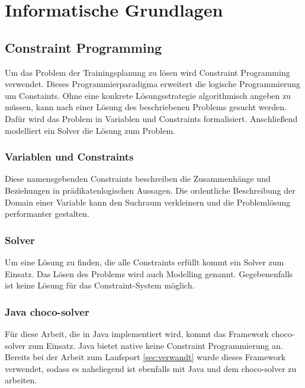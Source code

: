 \chapter{Informatische Grundlagen}
\label{sec:grundlagen:info}
\section{Constraint Programming}
Um das Problem der Trainingsplanung zu lösen wird Constraint Programming verwendet.\cite{ConstraintProgrammierung} Dieses Programmierparadigma erweitert die logische Programmierung um Constaints. Ohne eine konkrete Lösungsstrategie algorithmisch angeben zu müssen, kann nach einer Lösung des beschriebenen Problems gesucht werden. Dafür wird das Problem in Variablen und Constraints formalisiert. Anschließend modelliert ein Solver die Lösung zum Problem.
\subsection{Variablen und Constraints}
Diese namensgebenden Constraints beschreiben die Zusammenhänge und Beziehungen in prädikatenlogischen Aussagen. Die ordentliche Beschreibung der Domain einer Variable kann den Suchraum verkleinern und die Problemlösung performanter gestalten.
\subsection{Solver}
Um eine Lösung zu finden, die alle Constraints erfüllt kommt ein Solver zum Einsatz. Das Lösen des Problems wird auch Modelling genannt. Gegebenenfalls ist keine Lösung für das Constraint-System möglich. 
\subsection{Java choco-solver}
Für diese Arbeit, die in Java \cite{arnold2005java} implementiert wird, kommt das Framework choco-solver \cite{ChocoSolverWeb} zum Einsatz. Java bietet native keine Constraint Programmierung an. Bereits bei der Arbeit zum Laufsport \ref{sec:verwandt} wurde dieses Framework verwendet, sodass es naheliegend ist ebenfalls mit Java und dem choco-solver zu arbeiten.